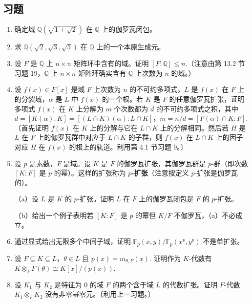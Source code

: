 \subsection*{习题}

\begin{enumerate}
\item 确定域 \(\mathbb{Q}(\sqrt{1+\sqrt{2}})\) 在 \(\mathbb{Q}\) 上的伽罗瓦闭包。

\item 求 \(\mathbb{Q}(\sqrt{2}, \sqrt{3}, \sqrt{5})\) 在 \(\mathbb{Q}\) 上的一个本原生成元。

\item 设 \(F\) 是 \(\mathbb{Q}\) 上 \(n \times n\) 矩阵环中含有的域。证明 \([F:\mathbb{Q}] \leq n\).（注意由第 13.2 节习题 19，\(\mathbb{Q}\) 上 \(n \times n\) 矩阵环确实含有 \(\mathbb{Q}\) 上次数为 \(n\) 的域。）

\item 设 \(f(x) \in F[x]\) 是域 \(F\) 上次数为 \(n\) 的不可约多项式，\(L\) 是 \(f(x)\) 在 \(F\) 上的分裂域，\(\alpha\) 是 \(L\) 中 \(f(x)\) 的一个根。若 \(K\) 是 \(F\) 的任意伽罗瓦扩张，证明多项式 \(f(x)\) 在 \(K\) 上分解为 \(m\) 个次数都为 \(d\) 的不可约多项式之积，其中 \(d = [K(\alpha):K] = [(L \cap K)(\alpha):L \cap K]\)，\(m = n/d = [F(\alpha) \cap K:F]\).〔首先证明 \(f(x)\) 在 \(K\) 上的分解与它在 \(L \cap K\) 上的分解相同。然后若 \(H\) 是 \(L\) 在 \(F\) 上的伽罗瓦群中对应于 \(L \cap K\) 的子群，则 \(f(x)\) 在 \(L \cap K\) 上的因子对应 \(H\) 在 \(f(x)\) 的根上的轨道。利用第 4.1 节习题 9。〕

\item 设 \(p\) 是素数，\(F\) 是域。设 \(K\) 是 \(F\) 的伽罗瓦扩张，其伽罗瓦群是 \(p\)-群（即次数 \([K:F]\) 是 \(p\) 的幂）。这样的扩张称为 \textbf{\(p\)-扩张}（注意按定义 \(p\)-扩张是伽罗瓦的）。

（a）设 \(L\) 是 \(K\) 的 \(p\)-扩张。证明 \(L\) 在 \(F\) 上的伽罗瓦闭包是 \(F\) 的 \(p\)-扩张。

（b）给出一个例子表明若 \([K:F]\) 是 \(p\) 的幂但 \(K/F\) 不伽罗瓦，（a）不必成立。

\item 通过显式给出无限多个中间子域，证明 \(\mathbb{F}_p(x, y)/\mathbb{F}_p(x^p, y^p)\) 不是单扩张。

\item 设 \(F \subseteq K \subseteq L\)，\(\theta \in L\) 且 \(p(x) = m_{\theta,F}(x)\). 证明作为 \(K\)-代数有 \(K \otimes_F F(\theta) \cong K[x]/(p(x))\).

\item 设 \(K_1\) 与 \(K_2\) 是特征为 0 的域 \(F\) 的两个含于域 \(L\) 的代数扩张。证明 \(F\)-代数 \(K_1 \otimes_F K_2\) 没有非零幂零元。〔利用上一习题。〕
\end{enumerate}

